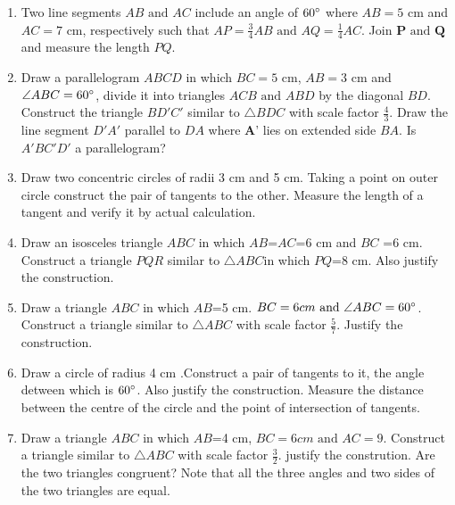 \documentclass[12pt]{article}
\let\vec\mathbf
\begin{document}
		\begin{enumerate}
\item Two line segments ${AB}\text{ and }{AC}$ include an angle of $60\degree$ where $AB=5$ cm and $AC=7$ cm, respectively such that $AP=\frac{3}{4}AB\text{ and }AQ=\frac{1}{4}AC$. Join $\vec{P}\text{ and }\vec{Q}$ and measure the length $PQ$.
\item Draw a parallelogram ${ABCD}$ in which $BC=5$ cm, $AB=3$ cm and $\angle{ABC}=60\degree$, divide it into triangles ${ACB}\text{ and }{ABD}$ by the diagonal $BD$. 
Construct the triangle $BD'C'$ similar to $\triangle{BDC}$ with scale factor $\frac{4}{3}$. Draw the line segment $D'A'$ parallel to $DA$ where $\vec{A}$' lies on extended side $BA$. Is $A'BC'D'$ a parallelogram? 
\item Draw two concentric circles of radii 3 cm and 5 cm. Taking a point on outer circle construct the pair of tangents to the other. Measure the length of a tangent and verify it by actual calculation.
\item Draw an isosceles triangle ${ABC}$ in which $AB$=$AC$=6 cm and $BC$ =6 cm. Construct a triangle $PQR$ similar to $\triangle{ABC}$in which $PQ$=8 cm. Also justify the construction.
\item Draw a triangle ${ABC}$ in which $AB$=5 cm. $BC=6 cm\text{ and }\angle {ABC}=60\degree$. Construct a triangle similar to $\triangle{ABC}$ with scale factor $\frac{5}{7}$. Justify the construction.
\item Draw a circle of radius 4 cm .Construct a pair of tangents to it, the angle detween which is $60\degree$. Also justify the construction. Measure the distance between the centre of the circle and the point of intersection of tangents.
\item Draw a triangle ${ABC}$ in which $AB$=4 cm, $BC=6 cm\text{ and }AC=9$. Construct a triangle similar to $\triangle{ABC}$ with scale factor $\frac{3}{2}$. justify the constrution. Are the two triangles congruent? Note that all the three angles and two sides of the two triangles are equal.

	\end{enumerate}
\end{document}
